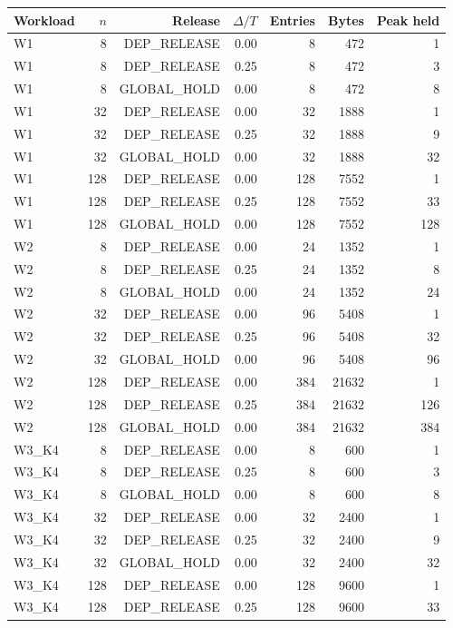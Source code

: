 \begin{table}[t]
\centering
\begin{tabular}{lrrrrrr}
\toprule
Workload & $n$ & Release & $\Delta/T$ & Entries & Bytes & Peak held \\
\midrule
W1 & 8 & DEP\_RELEASE & 0.00 & 8 & 472 & 1 \\
W1 & 8 & DEP\_RELEASE & 0.25 & 8 & 472 & 3 \\
W1 & 8 & GLOBAL\_HOLD & 0.00 & 8 & 472 & 8 \\
W1 & 32 & DEP\_RELEASE & 0.00 & 32 & 1888 & 1 \\
W1 & 32 & DEP\_RELEASE & 0.25 & 32 & 1888 & 9 \\
W1 & 32 & GLOBAL\_HOLD & 0.00 & 32 & 1888 & 32 \\
W1 & 128 & DEP\_RELEASE & 0.00 & 128 & 7552 & 1 \\
W1 & 128 & DEP\_RELEASE & 0.25 & 128 & 7552 & 33 \\
W1 & 128 & GLOBAL\_HOLD & 0.00 & 128 & 7552 & 128 \\
W2 & 8 & DEP\_RELEASE & 0.00 & 24 & 1352 & 1 \\
W2 & 8 & DEP\_RELEASE & 0.25 & 24 & 1352 & 8 \\
W2 & 8 & GLOBAL\_HOLD & 0.00 & 24 & 1352 & 24 \\
W2 & 32 & DEP\_RELEASE & 0.00 & 96 & 5408 & 1 \\
W2 & 32 & DEP\_RELEASE & 0.25 & 96 & 5408 & 32 \\
W2 & 32 & GLOBAL\_HOLD & 0.00 & 96 & 5408 & 96 \\
W2 & 128 & DEP\_RELEASE & 0.00 & 384 & 21632 & 1 \\
W2 & 128 & DEP\_RELEASE & 0.25 & 384 & 21632 & 126 \\
W2 & 128 & GLOBAL\_HOLD & 0.00 & 384 & 21632 & 384 \\
W3\_K4 & 8 & DEP\_RELEASE & 0.00 & 8 & 600 & 1 \\
W3\_K4 & 8 & DEP\_RELEASE & 0.25 & 8 & 600 & 3 \\
W3\_K4 & 8 & GLOBAL\_HOLD & 0.00 & 8 & 600 & 8 \\
W3\_K4 & 32 & DEP\_RELEASE & 0.00 & 32 & 2400 & 1 \\
W3\_K4 & 32 & DEP\_RELEASE & 0.25 & 32 & 2400 & 9 \\
W3\_K4 & 32 & GLOBAL\_HOLD & 0.00 & 32 & 2400 & 32 \\
W3\_K4 & 128 & DEP\_RELEASE & 0.00 & 128 & 9600 & 1 \\
W3\_K4 & 128 & DEP\_RELEASE & 0.25 & 128 & 9600 & 33 \\

\end{tabular}
\end{table}
